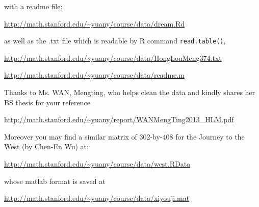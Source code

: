 \documentclass[11pt]{article}
\begin{document}
\noindent with a readme file:

\url{http://math.stanford.edu/~yuany/course/data/dream.Rd}

\noindent as well as the .txt file which is readable by R command {\tt read.table()},

\url{http://math.stanford.edu/~yuany/course/data/HongLouMeng374.txt}

\url{http://math.stanford.edu/~yuany/course/data/readme.m}

Thanks to Ms. WAN, Mengting, who helps clean the data and kindly shares her BS thesis for your reference
 
\url{http://math.stanford.edu/~yuany/report/WANMengTing2013_HLM.pdf}

%

Moreover you may find a similar matrix of 302-by-408 for the Journey to the West (by Chen-En Wu) at:

\url{http://math.stanford.edu/~yuany/course/data/west.RData}

\noindent whose matlab format is saved at

\url{http://math.stanford.edu/~yuany/course/data/xiyouji.mat}



%
%
% 
%
%
%
%
%
%
\end{document}

